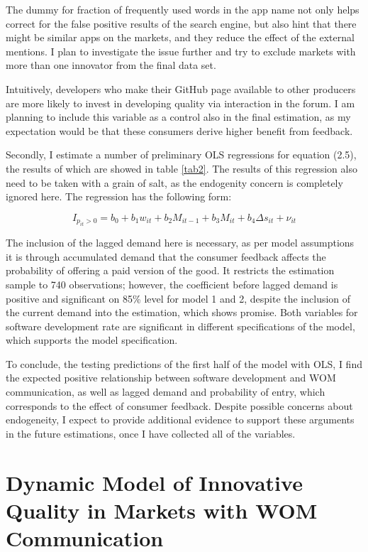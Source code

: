\documentclass[13pt]{article}
\numberwithin{figure}{section}
\numberwithin{table}{section}
\theoremstyle{indented}
\numberwithin{equation}{section} %
\begin{document}
The dummy for fraction of frequently used words in the app name not only helps correct for the false positive results of the search engine, but also hint that there might be similar apps on the markets, and they reduce the effect of the external mentions. I plan to investigate the issue further and try to exclude markets with more than one innovator from the final data set.

Intuitively, developers who make their GitHub page available to other producers are more likely to invest in developing quality via interaction in the forum. I am planning to include this variable as a control also in the final estimation, as my expectation would be that these consumers derive higher benefit from feedback.

Secondly, I estimate a number of preliminary OLS regressions for equation (2.5), the results of which are showed in table \ref{tab2}. The results of this regression also need to be taken with a grain of salt, as the endogenity concern is completely ignored here. The regression has the following form:

$$I_{p_{it}>0} = b_0 + b_1w_{it} + b_2M_{it-1} + b_3M_{it} + b_4\Delta s_{it} + \nu_{it}$$

The inclusion of the lagged demand here is necessary, as per model assumptions it is through accumulated demand that the consumer feedback affects the probability of offering a paid version of the good. It restricts the estimation sample to 740 observations; however, the coefficient before lagged demand is positive and significant on 85\% level for model 1 and 2, despite the inclusion of the current demand into the estimation, which shows promise. Both variables for software development rate are significant in different specifications of the model, which supports the model specification.


To conclude, the testing predictions of the first half of the model with OLS, I find the expected positive relationship between software development and WOM communication, as well as lagged demand and probability of entry, which corresponds to the effect of consumer feedback. Despite possible concerns about endogeneity, I expect to provide additional evidence to support these arguments in the future estimations, once I have collected all of the variables.

\newpage
\section{Dynamic Model of Innovative Quality in Markets with WOM Communication}
\end{document}
